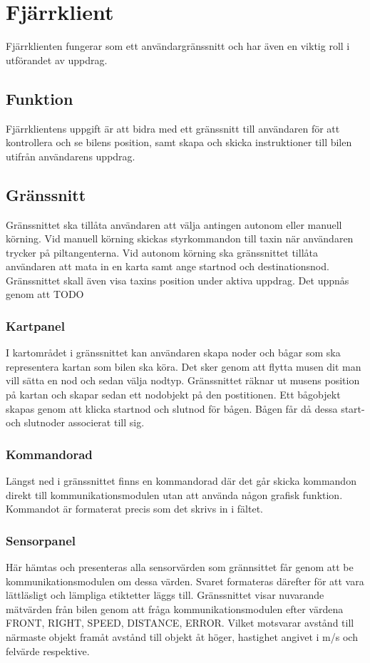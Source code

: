 \documentclass[tekniskrapport/tech.tex]{subfiles}
\begin{document}
\section{Fjärrklient}
Fjärrklienten fungerar som ett användargränssnitt och har även en
viktig roll i utförandet av uppdrag.

\subsection{Funktion}
Fjärrklientens uppgift är att bidra med ett gränssnitt till användaren för att
kontrollera och se bilens position, samt skapa och skicka instruktioner till
bilen utifrån användarens uppdrag.

\subsection{Gränssnitt} Gränssnittet ska tillåta användaren att välja antingen
autonom eller manuell körning. Vid manuell körning skickas styrkommandon till
taxin när användaren trycker på piltangenterna. Vid autonom körning ska
gränssnittet tillåta användaren att mata in en karta samt ange startnod och
destinationsnod. Gränssnittet skall även visa taxins position under aktiva
uppdrag. Det uppnås genom att TODO

\subsubsection{Kartpanel}
I kartområdet i gränssnittet kan användaren skapa noder och bågar som ska
representera kartan som bilen ska köra. Det sker genom att flytta musen dit
man vill sätta en nod och sedan välja nodtyp. Gränssnittet räknar
ut musens position på kartan och skapar sedan ett nodobjekt på den postitionen.
Ett bågobjekt skapas genom att klicka startnod och slutnod för bågen.
Bågen får då dessa start- och slutnoder associerat till sig.

\subsubsection{Kommandorad}
Längst ned i gränssnittet finns en kommandorad där det går skicka kommandon
direkt till kommunikationsmodulen utan att använda någon grafisk funktion.
Kommandot är formaterat precis som det skrivs in i fältet.

\subsubsection{Sensorpanel}
Här hämtas och presenteras alla sensorvärden som grännsittet får genom att be
kommunikationsmodulen om dessa värden. Svaret formateras därefter för att vara
lättläsligt och lämpliga etiktetter läggs till. Gränssnittet visar nuvarande
mätvärden från bilen genom att fråga kommunikationsmodulen efter värdena FRONT,
RIGHT, SPEED, DISTANCE, ERROR. Vilket motsvarar avstånd till närmaste objekt
framåt avstånd till objekt åt höger, hastighet angivet i m/s och felvärde
respektive. 
\end{document}
